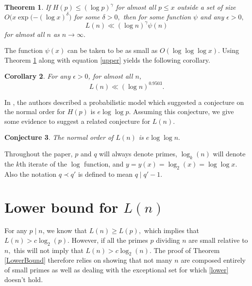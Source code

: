 \documentclass[12pt,regno]{amsart}
\newtheorem{theorem}{Theorem}
\newtheorem{corollary}[theorem]{Corollary}
\newtheorem{conjecture}[theorem]{Conjecture}
\begin{document}
\begin{theorem}\label{UpperBound}
If $H(p) \le (\log p)^{\gamma}$ for almost all $p\le x$ outside a set of size $O\big(x\exp({-}(\log x)^\delta\big)$ for some $\delta>0,$ then for some function $\psi$ and any $\epsilon>0,$ $$L(n) \ll (\log n)^{\gamma}\psi(n)$$ for almost all $n$ as $n \rightarrow \infty.$
\end{theorem}The function $\psi(x)$ can be taken to be as small as $O(\log\log\log x).$ Using Theorem \ref{UpperBound} along with equation \eqref{upper} yields the following corollary.
\begin{corollary}
For any $\epsilon>0$, for almost all $n$, $$L(n) \ll (\log n)^{0.9503}.$$
\end{corollary} 

In \cite{FKL}, the authors described a probabilistic model which suggested a conjecture on the normal order for $H(p)$ is $e\log\log p.$ Assuming this conjecture, we give some evidence to suggest a related conjecture for $L(n).$

\begin{conjecture}\label{conj1}
The normal order of $L(n)$ is $e\log\log n.$
\end{conjecture} 
Throughout the paper, $p$ and $q$ will always denote primes, $\log_k(n)$ will denote the $k$th iterate of the $\log$ function, and $y=y(x)=\log_2(x)=\log\log x.$ Also the notation $q \prec q'$ is defined to mean  $q \mid q'-1.$

\section{Lower bound for $L(n)$}
For any $p \mid n$, we know that $L(n) \ge L(p),$ which implies that $L(n)>c\log_2(p).$ However, if all the primes $p$ dividing $n$ are small relative to $n,$ this will not imply that $L(n)>c\log_2(n).$ The proof of Theorem \ref{LowerBound} therefore relies on showing that not many $n$ are composed entirely of small primes as well as dealing with the exceptional set for which \eqref{lower} doesn't hold.
\end{document}

